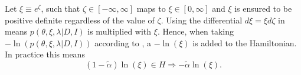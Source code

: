 \begin{example}
	Let $\xi \equiv e^\zeta$, such that $\zeta\in [-\infty,\infty]$ maps to $\xi\in[0,\infty]$ and $\xi$ is ensured to be positive definite regardless of the value of $\zeta$. Using the differential $d\xi =  \xi d\zeta$ in  means $p(\theta,\xi,\lambda|D,I)$ is multiplied with $\xi$. Hence, when taking $-\ln(p(\theta,\xi,\lambda|D,I))$ according to , a $-\ln(\xi)$ is added to the Hamiltonian. In practice this means
	\begin{equation}
		(1-\tilde{\alpha})\ln(\xi)\in H\Rightarrow -\tilde{\alpha}\ln(\xi).
	\end{equation} 	
\end{example}



